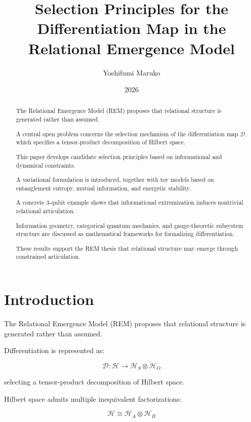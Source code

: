 \documentclass[11pt]{article}
\title{
Selection Principles for the Differentiation Map in the Relational Emergence Model
}
\author{
Yoshifumi Maruko
}
\date{2026}
\begin{document}
\maketitle

\begin{abstract}

The Relational Emergence Model (REM) proposes that relational structure is generated rather than assumed.

A central open problem concerns the selection mechanism of the differentiation map $\mathcal{D}$, which specifies a tensor-product decomposition of Hilbert space.

This paper develops candidate selection principles based on informational and dynamical constraints.

A variational formulation is introduced, together with toy models based on entanglement entropy, mutual information, and energetic stability.

A concrete 3-qubit example shows that informational extremization induces nontrivial relational articulation.

Information geometry, categorical quantum mechanics, and gauge-theoretic subsystem structure are discussed as mathematical frameworks for formalizing differentiation.

These results support the REM thesis that relational structure may emerge through constrained articulation.

\end{abstract}

\section{Introduction}

The Relational Emergence Model (REM) proposes that relational structure is generated rather than assumed.

Differentiation is represented as:

\begin{equation}
\mathcal{D} :
\mathcal{H}
\rightarrow
\mathcal{H}_S \otimes \mathcal{H}_O
\end{equation}

selecting a tensor-product decomposition of Hilbert space.

Hilbert space admits multiple inequivalent factorizations:

\begin{equation}
\mathcal{H}
\cong
\mathcal{H}_A \otimes \mathcal{H}_B
\end{equation}
\end{document}
